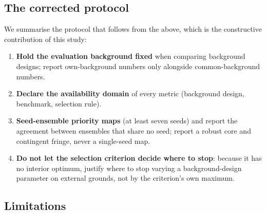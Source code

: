 \documentclass[12pt]{article}
\begin{document}
\subsection{The corrected protocol}

We summarise the protocol that follows from the above, which is the constructive contribution of this study:

\begin{enumerate}
  \item \textbf{Hold the evaluation background fixed} when comparing background designs; report own-background numbers only alongside common-background numbers.
  \item \textbf{Declare the availability domain} of every metric (background design, benchmark, selection rule).
  \item \textbf{Seed-ensemble priority maps} (at least seven seeds) and report the agreement between ensembles that share no seed; report a robust core and contingent fringe, never a single-seed map.
  \item \textbf{Do not let the selection criterion decide where to stop}: because it has no interior optimum, justify where to stop varying a background-design parameter on external grounds, not by the criterion's own maximum.
\end{enumerate}

\subsection{Limitations}
\label{sec:limitations}
\end{document}
